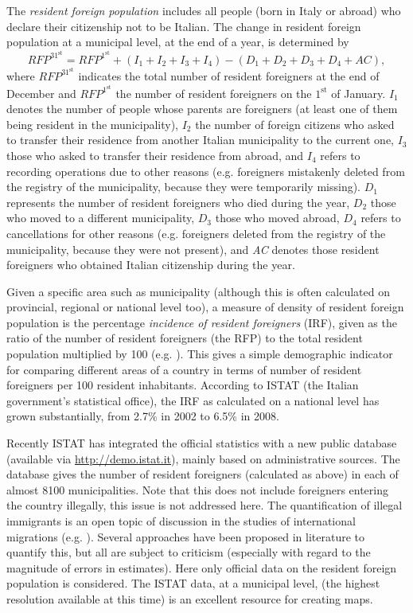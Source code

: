The \textit{resident foreign population} includes all people (born in Italy or abroad) who declare their citizenship not to be Italian. The change in resident foreign population at a municipal level, at the end of a year, is determined by
\begin{equation}
RFP^{31^\text{st}} = RFP^{1^\text{st}} + (I_1 + I_2 + I_3+ I_4) - (D_1 + D_2 + D_3 + D_4 + AC),
\label{it-rfp}
\end{equation}
where $RFP^{31^\text{st}}$ indicates the total number of resident foreigners at the end of December and $RFP^{1^\text{st}}$ the number of resident foreigners on the $1^\text{st}$ of January. $I_{1}$ denotes the number of people whose parents are foreigners (at least one of them being resident in the municipality), $I_{2}$ the number of foreign citizens who asked to transfer their residence from another Italian municipality to the current one, $I_{3}$ those who asked to transfer their residence from abroad, and $I_{4}$ refers to recording operations due to other reasons (e.g. foreigners mistakenly deleted from the registry of the municipality, because they were temporarily missing). $D_{1}$ represents the number of resident foreigners who died during the year, $D_{2}$ those who moved to a different municipality, $D_{3}$ those who moved abroad, $D_{4}$ refers to cancellations for other reasons (e.g. foreigners deleted from the registry of the municipality, because they were not present), and \textit{AC} denotes those resident foreigners who obtained Italian citizenship during the year. 

Given a specific area such as municipality (although this is often calculated on provincial, regional or national level too), a measure of density of resident foreign population is the percentage \textit{incidence of resident foreigners} (IRF), given as the ratio of the number of resident foreigners (the RFP) to the total resident population multiplied by 100 (e.g. \cite{Lowell2007}). This gives a simple demographic indicator for comparing different areas of a country in terms of number of resident foreigners per 100 resident inhabitants. According to ISTAT (the Italian government's statistical office), the IRF as calculated on a national level has grown substantially, from 2.7\% in 2002 to 6.5\% in 2008. 

Recently ISTAT has integrated the official statistics with a new public database (available via \url{http://demo.istat.it}), mainly based on administrative sources. The database gives the number of resident foreigners (calculated as above) in each of almost 8100 municipalities. Note that this does not include foreigners entering the country illegally, this issue is not addressed here. The quantification of illegal immigrants is an open topic of discussion in the studies of international migrations (e.g. \cite{Strozza2004}). Several approaches have been proposed in literature to quantify this, but all are subject to criticism (especially with regard to the magnitude of errors in estimates). Here only official data on the resident foreign population is considered. The ISTAT data, at a municipal level, (the highest resolution available at this time) is an excellent resource for creating maps.

